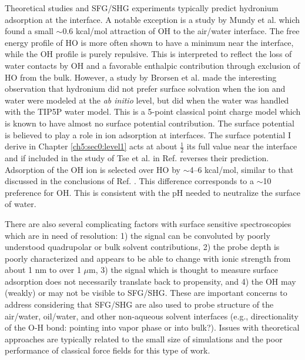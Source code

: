 \begin{intro}
   Theoretical studies and SFG/SHG experiments typically predict hydronium adsorption at the interface\cite{buch2007surfacid,mucha2005unified,petersen2008liquid,tse2015propensity,willow2011nh4+}.
   A notable exception is a study by Mundy et al. which found a small $\sim$0.6 kcal/mol attraction of OH\sur{-} to the air/water interface\cite{mundy2009hydroxide}. The 
   free energy profile of HO\sur{+} is more often shown to have a minimum near the interface, while the OH\sur{-} profile is purely repulsive. This is interpreted to
   reflect the loss of water contacts by OH\sur{-} and a favorable enthalpic contribution through exclusion of HO\sur{+} from the bulk\cite{tse2015propensity}. However, 
   a study by Brorsen et al. made the interesting observation that hydronium did not prefer surface solvation when the ion and water were modeled at the \emph{ab initio} level, 
   but did when the water was handled with the TIP5P water model\cite{brorsen2014surface}. This is a 5-point classical point charge model which is known to have almost no 
   surface potential contribution\cite{remsing2014lp}. The surface potential is believed to play a role in ion adsorption at interfaces\cite{ayse2012,duignan2015hydronium}.
   The surface potential I derive in Chapter \ref{ch5:sec0:level1} acts at about $\frac{1}{2}$ its full value near the interface and if included in the study of Tse et al. in Ref. 
   \cite{tse2015propensity} reverses their prediction. Adsorption of the OH\sur{-} ion is selected over HO\sur{+} by $\sim$4--6 kcal/mol, similar to that discussed 
   in the conclusions of Ref. \cite{liu2012surface}. This difference corresponds to a $\sim$10 preference for OH\sur{-}. This is consistent with the pH needed to 
   neutralize the surface of water.
   
   There are also several complicating factors with surface sensitive spectroscopies which are in need of resolution: 1) the signal can be convoluted by poorly understood 
   quadrupolar or bulk solvent contributions\cite{carrier2016ionsatowinterface,kundu2016bend}, 2) the probe depth is poorly characterized and appears to be able to change with
   ionic strength from about 1 nm to over 1 $\mu$m\cite{gonella2016second}, 3) the signal which is thought to measure surface adsorption does not necessarily translate back to
   propensity\cite{carrier2016ionsatowinterface}, and 4) the OH\sur{-} may (weakly) or may not be visible to SFG/SHG\cite{imamura2014molecular,mishra2012surfacid}. These are
   important concerns to address considering that SFG/SHG are also used to probe structure of the air/water, oil/water, and other non-aqueous solvent
   interfaces (e.g., directionality of the O-H bond: pointing into vapor phase or into bulk?)\cite{conboy1997shg_tatb,luo2015electrobreak,wang2016surface}. Issues with 
   theoretical approaches are typically related to the small size of simulations and the poor performance of classical force fields for this type of work\cite{beattie2014surfacid}.
   

\end{intro}
